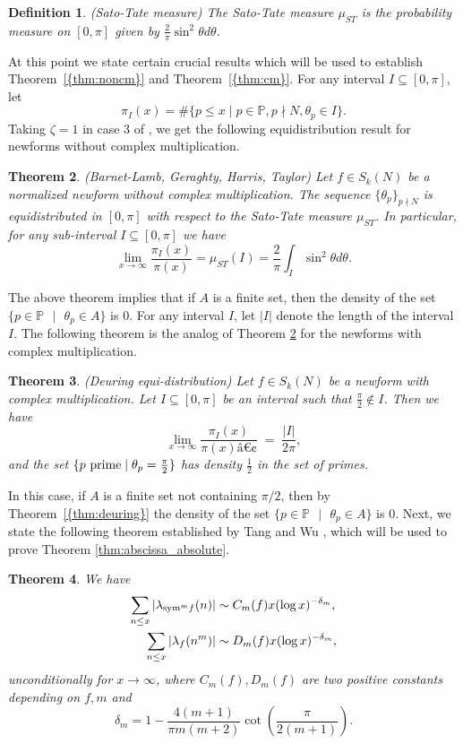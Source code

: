 \documentclass[12pt,a4paper,reqno]{amsart}
\newtheorem{theorem}{Theorem}[section]
\newtheorem{definition}[theorem]{Definition}
\begin{document}
\begin{definition}\label{defn:satotatemeasure}{\rm (Sato-Tate measure)}
The Sato-Tate measure $\mu_{ST}$ is the probability measure on $[0,\pi]$ given by 
$\frac{2}{\pi}\sin^2\theta d\theta$.
\end{definition}
At this point we state certain crucial results which will be used to establish {Theorem~\ref{{thm:noncm}}} and {Theorem~\ref{{thm:cm}}}.
For any interval $I\subseteq [0,\pi]$, let 
$$\pi_I(x)=\# \{p \leq x \mid p\in\mathbb{P}, p\nmid N, \theta_p\in I\}.$$
 Taking $\zeta=1$ in case 3 of \cite[Theorem B]{BGHT}, we get the following equidistribution result for newforms without complex multiplication.
\begin{theorem}\label{thm:satotate}{\rm (Barnet-Lamb, Geraghty, Harris, Taylor)}
Let $f\in S_k(N)$ be a normalized newform without complex multiplication. The sequence 
$\{\theta_p\}_{p\nmid N}$ is equidistributed in $[0,\pi]$ with respect to the Sato-Tate measure $\mu_{ST}$. In particular, for any sub-interval $I\subseteq[0,\pi]$ we have
$$
\lim_{x\to 
\infty}\frac{\pi_I(x)}{\pi(x)}=\mu_{ST}(I)=\frac{2}{\pi}\int_I\sin^2{\theta} d\theta.
$$
\end{theorem}
The above theorem implies that if $A$ is a finite set, then the density of the set 
$\{p\in \mathbb{P} ~~~|~~~ \theta_p\in A\}$ is $0$.
For any interval $I$, let $\vert I \vert$ denote the length of the interval $I$. The following theorem is the analog of Theorem \ref{thm:satotate} for the newforms with complex multiplication.
\begin{theorem}\label{thm:deuring}{\rm (Deuring equi-distribution)}
Let $f\in S_k(N)$ be a newform with complex multiplication.
Let $I\subseteq [0,\pi]$ be an interval such that  $\frac{\pi}{2}\notin I$. Then we have 
\[
\lim_{x\to \infty}\frac{\pi_I(x)}{\pi(x)â¢}\;=\; \frac{\vert I\vert}{2\pi},
\]
and the set $\{p \ {\rm prime} \mid \theta_p=\frac{\pi}{2}\}$ has density $\frac{1}{2}$ in the set of primes.
\end{theorem}
In this case, if $A$ is a finite set not containing $\pi/2$, then by {Theorem~\ref{{thm:deuring}}} the density of the set $\{p\in \mathbb{P} ~~~|~~~ \theta_p\in A\}$ is $0$.
Next, we state the following theorem established by Tang and Wu \cite{TW}, which will be used to prove 
Theorem \ref{thm:abscissa_absolute}.
\begin{theorem}\label{thm:TW}
We have 
\begin{equation}\label{eq:3}
\begin{split}
\sum_{n\leq x} \vert \lambda_{{\rm sym}^m f}(n) \vert & \sim C_m(f) x (\log 
x)^{-\delta_m},\\
\sum_{n\leq x} \vert \lambda_f(n^m) \vert & \sim D_m(f) x (\log 
x)^{-\delta_m},
\end{split}
\end{equation}
unconditionally for $x \rightarrow \infty$, where $C_m(f), D_m(f)$ are two positive 
constants depending on $f, m$ and
\begin{equation*}
\delta_m = 1-\frac{4 (m+1)}{\pi m(m+2)} \cot \left( \frac{\pi}{2(m+1)}\right).
\end{equation*}
\end{theorem}
\end{document}
